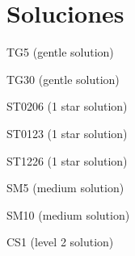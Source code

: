 \documentclass[10pt,letterpaper]{article}
\author{Germ\'{a}n Avendaño Ram\'{i}rez}
\begin{document}
\cluefont{\normalsize}
\section*{Soluciones}

\noindent\begin{minipage}{0.47\linewidth}\begin{center}
TG5 (gentle solution) \\
\end{center}\end{minipage}\hfill
\begin{minipage}{0.47\linewidth}\begin{center}
TG30 (gentle solution) \\
\end{center}\end{minipage}
\vspace*{12pt}

\begin{minipage}{0.47\linewidth}\begin{center}
ST0206 (1 star solution) \\
\end{center}\end{minipage}\hfill
\noindent\begin{minipage}{0.47\linewidth}\begin{center}
ST0123 (1 star solution) \\
\end{center}\end{minipage}
\vspace*{12pt}

\begin{minipage}{0.47\linewidth}\begin{center}
ST1226 (1 star solution) \\
\end{center}\end{minipage}\hfill
\noindent\begin{minipage}{0.47\linewidth}\begin{center}
SM5 (medium solution) \\
\end{center}\end{minipage}

\newpage
\begin{minipage}{0.47\linewidth}\begin{center}
SM10 (medium solution) \\
\end{center}\end{minipage}\hfill
\begin{minipage}{0.47\linewidth}\begin{center}
CS1 (level 2 solution) \\
\end{center}\end{minipage}
\vspace*{12pt}
\end{document}

